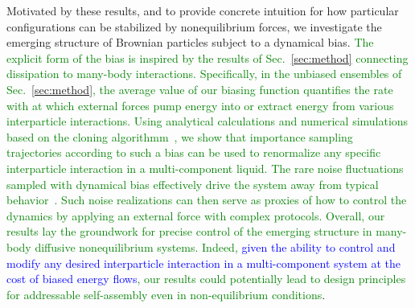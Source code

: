 \documentclass[superscriptaddress, twocolumn, prx, longbibliography, nofootinbib]{revtex4-1}
\begin{document}
Motivated by these results, and to provide concrete intuition for how particular configurations can be stabilized by nonequilibrium forces, we investigate the emerging structure of Brownian particles subject to a dynamical bias. \textcolor{green}{The explicit form of the bias is inspired by the results of Sec.~\ref{sec:method} connecting dissipation to many-body interactions. Specifically, in the unbiased ensembles of Sec.~\ref{sec:method}, the average value of our biasing function quantifies the rate with at which external forces pump energy into or extract energy from various interparticle interactions. Using analytical calculations and numerical simulations based on the cloning algorithmm~\cite{Giadina2006, tailleur2007probing, Hurtado2009, Nemoto2016, Ray2018, Klymko2018, Brewer2018}, we show that importance sampling trajectories according to such a bias can be used to renormalize any specific interparticle interaction in a multi-component liquid. The rare noise fluctuations sampled with dynamical bias effectively drive the system away from typical behavior~\cite{garrahan2007, Hedges2009, Jack2010, Pitard2011, Speck2012, Bodineau2012a, Chetrite2013, Limmer2014, Nemoto2017}. Such noise realizations can then serve as proxies of how to control the dynamics by applying an external force with complex protocols. Overall, our results lay the groundwork for precise control of the emerging structure in many-body diffusive nonequilibrium systems. Indeed, \textcolor{blue}{given the ability to control and modify any desired interparticle interaction in a multi-component system at the cost of biased energy flows}, our results could potentially lead to design principles for addressable self-assembly even in non-equilibrium conditions}.



\end{document}
